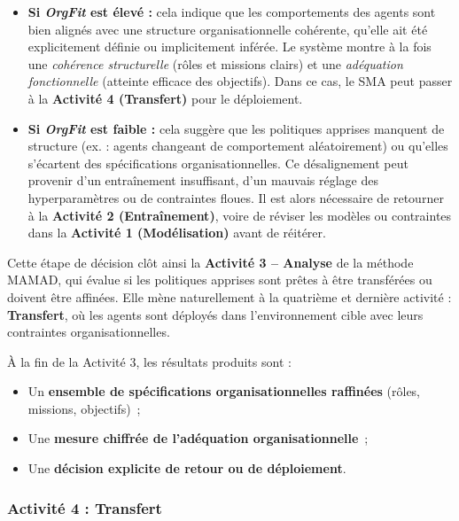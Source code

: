 \begin{itemize}
    \item \textbf{Si \textit{OrgFit} est élevé :} cela indique que les comportements des agents sont bien alignés avec une structure organisationnelle cohérente, qu'elle ait été explicitement définie ou implicitement inférée. Le système montre à la fois une \textit{cohérence structurelle} (rôles et missions clairs) et une \textit{adéquation fonctionnelle} (atteinte efficace des objectifs). Dans ce cas, le SMA peut passer à la \textbf{Activité 4 (Transfert)} pour le déploiement.

    \item \textbf{Si \textit{OrgFit} est faible :} cela suggère que les politiques apprises manquent de structure (ex. : agents changeant de comportement aléatoirement) ou qu'elles s'écartent des spécifications organisationnelles. Ce désalignement peut provenir d'un entraînement insuffisant, d'un mauvais réglage des hyperparamètres ou de contraintes floues. Il est alors nécessaire de retourner à la \textbf{Activité 2 (Entraînement)}, voire de réviser les modèles ou contraintes dans la \textbf{Activité 1 (Modélisation)} avant de réitérer.
\end{itemize}

\vspace{0.4em}
\noindent Cette étape de décision clôt ainsi la \textbf{Activité 3 – Analyse} de la méthode MAMAD, qui évalue si les politiques apprises sont prêtes à être transférées ou doivent être affinées. Elle mène naturellement à la quatrième et dernière activité : \textbf{Transfert}, où les agents sont déployés dans l'environnement cible avec leurs contraintes organisationnelles.

\vspace{0.4em}
\noindent À la fin de la Activité 3, les résultats produits sont :
\begin{itemize}
    \item Un \textbf{ensemble de spécifications organisationnelles raffinées} (rôles, missions, objectifs)~;
    \item Une \textbf{mesure chiffrée de l'adéquation organisationnelle}~;
    \item Une \textbf{décision explicite de retour ou de déploiement}.
\end{itemize}

\subsubsection{Activité 4 : Transfert}

